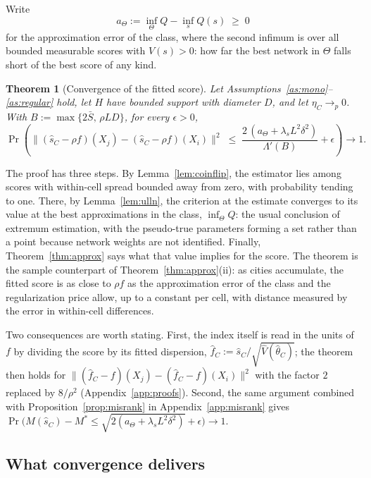 \documentclass[11pt]{article}
\newtheorem{theorem}{Theorem}
\theoremstyle{remark}
\newcommand{\Qt}{Q}
\begin{document}
Write
\[
    a_\Theta := \inf_{\Theta}\Qt - \inf_{s}\Qt(s) \;\ge\; 0
\]
for the approximation error of the class, where the second infimum is over all bounded measurable scores
with $V(s)>0$: how far the best network in $\Theta$ falls short of the best score of any kind.

\begin{theorem}[Convergence of the fitted score]\label{thm:consist}
Let Assumptions~\ref{as:mono}--\ref{as:regular} hold, let $H$ have bounded support with diameter $D$,
and let $\eta_C \to_p 0$. With $B := \max\{2\bar{S},\, \rho L D\}$, for every $\epsilon>0$,
\[
    \Pr\!\left( \big\|(\hat s_C - \rho f)(X_j)-(\hat s_C - \rho f)(X_i)\big\|^{2} \;\le\;
    \frac{2\,(a_\Theta + \lambda_s L^2\delta^2)}{\Lambda'(B)} + \epsilon \right) \to 1 .
\]
\end{theorem}

The proof has three steps. By Lemma~\ref{lem:coinflip}, the estimator lies among scores with
within-cell spread bounded away from zero, with probability tending to one. There, by
Lemma~\ref{lem:ulln}, the criterion at the estimate converges to its value at the best approximations
in the class, $\inf_\Theta\Qt$: the usual conclusion of extremum estimation, with the pseudo-true
parameters forming a set rather than a point because network weights are not identified. Finally,
Theorem~\ref{thm:approx} says what that value implies for the score. The theorem is the sample
counterpart of Theorem~\ref{thm:approx}(ii): as cities accumulate, the fitted score is as close to
$\rho f$ as the approximation error of the class and the regularization price allow, up to a constant
per cell, with distance measured by the error in within-cell differences.

Two consequences are worth stating. First, the index itself is read in the units of $f$ by dividing
the score by its fitted dispersion, $\hat f_C := \hat s_C/\sqrt{\hat V(\hat\theta_C)}$; the theorem
then holds for $\|(\hat f_C - f)(X_j)-(\hat f_C - f)(X_i)\|^{2}$ with the factor $2$ replaced by
$8/\rho^{2}$ (Appendix~\ref{app:proofs}). Second, the same argument combined with
Proposition~\ref{prop:misrank} in Appendix~\ref{app:misrank} gives
$\Pr\big(M(\hat s_C) - M^{*} \le \sqrt{2(a_\Theta + \lambda_s L^2\delta^2)} + \epsilon\big) \to 1$.

\subsection{What convergence delivers}\label{sec:convdisc}
\end{document}
